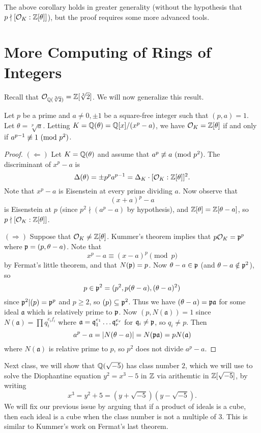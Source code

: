 \begin{remark}
  The above corollary holds in greater generality
  (without the hypothesis that $p \nmid [\mathcal{O}_K : \mathbb{Z}[\theta]]$),
  but the proof requires some more advanced tools.
\end{remark}

\section{More Computing of Rings of Integers}

\begin{remark}
  Recall that $\mathcal{O}_{\mathbb{Q}(\sqrt[3]{2})} = \mathbb{Z}[\sqrt[3]{2}]$.
  We will now generalize this result.
\end{remark}

\begin{theorem}
  Let $p$ be a prime and $a \ne 0, \pm 1$ be a
  square-free integer such that $(p, a) = 1$.
  Let $\theta = \sqrt[p]{a}$. Letting
  $K = \mathbb{Q}(\theta) = \mathbb{Q}[x] / (x^p - a)$, we have
  $\mathcal{O}_K = \mathbb{Z}[\theta]$
  if and only if $a^{p - 1} \not\equiv 1 \ (\mathrm{mod}\ p^2)$.
\end{theorem}

\begin{proof}
  $(\Leftarrow)$
  Let $K = \mathbb{Q}(\theta)$ and assume that
  $a^p \not\equiv a \ (\mathrm{mod}\ p^2)$. The discriminant
  of $x^p - a$ is
  \[
    \Delta(\theta) = \pm p^p a^{p - 1}
    = \Delta_K \cdot [\mathcal{O}_K : \mathbb{Z}[\theta]]^2.
  \]
  Note that $x^p - a$ is Eisenstein at every prime
  dividing $a$. Now observe that
  \[
    (x + a)^p - a
  \]
  is Eisenstein at $p$ (since $p^2 \nmid (a^p - a)$
  by hypothesis), and $\mathbb{Z}[\theta] = \mathbb{Z}[\theta - a]$,
  so $p \nmid [\mathcal{O}_K : \mathbb{Z}[\theta]]$.

  $(\Rightarrow)$ Suppose that $\mathcal{O}_K \ne \mathbb{Z}[\theta]$.
  Kummer's theorem implies that $p \mathcal{O}_K = \mathfrak{p}^p$ where
  $\mathfrak{p} = (p, \theta - a)$. Note that
  \[
    x^p - a \equiv (x - a)^p \pmod{p}
  \]
  by Fermat's little theorem, and that $N(\mathfrak{p}) = p$.
  Now $\theta - a \in \mathfrak{p}$ (and $\theta - a \notin \mathfrak{p}^2$), so
  \[
    p \in \mathfrak{p}^2 = (p^2, p(\theta - a), (\theta - a)^2)
  \]
  since $\mathfrak{p}^2 | (p) = \mathfrak{p}^p$ and $p \ge 2$, so
  $(p) \subseteq \mathfrak{p}^2$. Thus we have
  $(\theta - a) = \mathfrak{p} \mathfrak{a}$
  for some ideal $\mathfrak{a}$ which is relatively
  prime to $\mathfrak{p}$. Now
  $(p, N(\mathfrak{a})) = 1$ since
  $N(\mathfrak{a}) = \prod q_i^{e_i f_i}$ where
  $\mathfrak{a} = \mathfrak{q}_1^{e_1} \dots \mathfrak{q}_r^{e_r}$ for
  $\mathfrak{q}_i \ne \mathfrak{p}$, so $q_i \ne p$. Then
  \[
    a^p - a = |N(\theta - a)| = N(\mathfrak{p} \mathfrak{a})
    = p N(\mathfrak{a})
  \]
  where $N(\mathfrak{a})$ is relative prime to $p$,
  so $p^2$ does not divide $a^p - a$.
\end{proof}

\begin{remark}
  Next class, we will show that $\mathbb{Q}(\sqrt{-5})$
  has class number $2$, which we will use to solve
  the Diophantine equation $y^2 = x^3 - 5$ in $\mathbb{Z}$
  via arithemtic in $\mathbb{Z}[\sqrt{-5}]$, by writing
  \[
    x^3 = y^2 + 5 = (y + \sqrt{-5})(y - \sqrt{-5}).
  \]
  We will fix our previous issue by arguing
  that if a product of ideals is
  a cube, then each ideal is a cube when the class
  number is not a multiple of $3$. This is
  similar to Kummer's work on Fermat's last theorem.
\end{remark}
